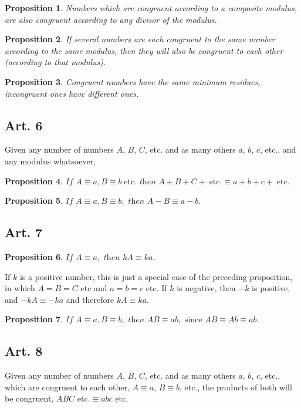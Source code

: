 \documentclass{book}
\theoremstyle{plain}
\newtheorem{proposition}{Proposition}
\begin{document}
\begin{proposition} Numbers which are congruent according to a composite modulus, are also congruent according to any divisor of the modulus. \end{proposition}

\begin{proposition} If several numbers are each congruent to the same number according to the same modulus, then they will also be congruent to each other (according to that modulus). \end{proposition}

\begin{proposition}  Congruent numbers have the same minimum residues, incongruent ones have different ones. \end{proposition}

\subsection*{Art. 6} Given any number of numbers $A$, $B$, $C$, etc. and as many others $a$, $b$, $c$, etc., and any modulus whatsoever, 
\begin{proposition} $\textit{If  }A \equiv a, B \equiv b \;\mathrm{ etc.} \textit{ then } A + B + C + \;\mathrm{etc.} \equiv a+b+c+\;\mathrm{etc.} $ \end{proposition}
\begin{proposition} $ \textit{If  }A \equiv a, B \equiv b, \textit{ then } A - B  \equiv a-b $. \end{proposition}

\subsection*{Art. 7} 
\begin{proposition} $ \textit{If  }A \equiv a, \textit{ then } kA \equiv ka $. \end{proposition}
If $k$ is a positive number, this is just a special case of the preceding proposition, in which $A=B=C$ etc and $a=b=c$ etc.  If $k$ is negative, then $-k$ is positive, and $-kA \equiv -ka$ and therefore $kA \equiv ka$.
\begin{proposition} $\textit{If  }A \equiv a, B \equiv b, \textit{ then } AB \equiv ab, \textrm{ since } AB \equiv Ab \equiv ab$.  \end{proposition}

\subsection*{Art. 8} Given any number of numbers $A$, $B$, $C$, etc. and as many others $a$, $b$, $c$, etc., which are congruent to each other, $A \equiv a$, $B \equiv b$, etc., the products of both will be congruent, $ABC$ etc.$\equiv abc$ etc.
\end{document}
